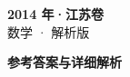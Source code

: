 \documentclass[zihao=-4, a4paper]{ctexart}
\begin{document}
\begin{center}
  {\Large\bfseries 2014 年·江苏卷}\\[4pt]
  {\large 数学 · 解析版}
\end{center}
\medskip
{}

\clearpage
{}
\begin{center}{\Large\bfseries 参考答案与详细解析}\end{center}
\medskip

\end{document}
